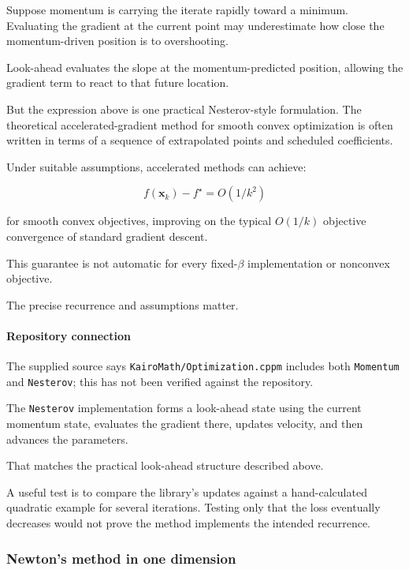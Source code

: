 Suppose momentum is carrying the iterate rapidly toward a minimum. Evaluating the gradient at the current point may underestimate how close the momentum-driven position is to overshooting.

Look-ahead evaluates the slope at the momentum-predicted position, allowing the gradient term to react to that future location.

But the expression above is one practical Nesterov-style formulation. The theoretical accelerated-gradient method for smooth convex optimization is often written in terms of a sequence of extrapolated points and scheduled coefficients.

Under suitable assumptions, accelerated methods can achieve:

\[
f(\mathbf x_k)-f^\star=O(1/k^2)
\]

for smooth convex objectives, improving on the typical \(O(1/k)\) objective convergence of standard gradient descent.

This guarantee is not automatic for every fixed-\(\beta\) implementation or nonconvex objective.

The precise recurrence and assumptions matter.

\paragraph{Repository connection}\label{02-foundations-ii-ch026-repository-connection}

The supplied source says \texttt{KairoMath/Optimization.cppm} includes both \texttt{Momentum} and \texttt{Nesterov}; this has not been verified against the repository.

The \texttt{Nesterov} implementation forms a look-ahead state using the current momentum state, evaluates the gradient there, updates velocity, and then advances the parameters.

That matches the practical look-ahead structure described above.

A useful test is to compare the library's updates against a hand-calculated quadratic example for several iterations. Testing only that the loss eventually decreases would not prove the method implements the intended recurrence.

\subsubsection{Newton's method in one dimension}\label{02-foundations-ii-ch026-newtons-method-in-one-dimension}


